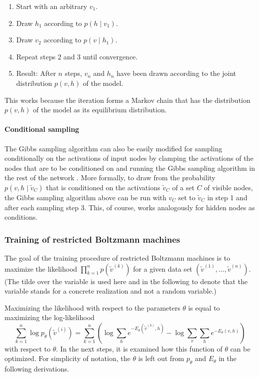 \documentclass[12pt]{article}
\begin{document}
\begin{enumerate}
\item Start with an arbitrary $v_1$.
\item Draw $h_1$ according to $p(h \mid v_1)$.
\item Draw $v_2$ according to $p(v \mid h_1)$.
\item Repeat steps 2 and 3 until convergence.
\item Result: After $n$ steps, $v_n$ and $h_n$ have been drawn according to the joint distribution $p(v,h)$ of the model.
\end{enumerate}

This works because the iteration forms a Markov chain that has the distribution $p(v,h)$ of the model as its equilibrium distribution.

\paragraph{Conditional sampling}\label{condsamplingrbm}
The Gibbs sampling algorithm can also be easily modified for sampling conditionally on the activations of input nodes by clamping the activations of the nodes that are to be conditioned on and running the Gibbs sampling algorithm in the rest of the network \citep{srivastava2012multimodal}.
More formally, to draw from the probability $p(v, h \mid \tilde{v}_C)$ that is conditioned on the activations $\tilde{v}_C$ of a set $C$ of visible nodes, the Gibbs sampling algorithm above can be run with $v_C$ set to $\tilde{v}_C$ in step 1 and after each sampling step 3.
This, of course, works analogously for hidden nodes as conditions.


\subsubsection{Training of restricted Boltzmann machines}\label{rbmtraining}
The goal of the training procedure of restricted Boltzmann machines is to maximize the likelihood $\prod_{k=1}^n p(\tilde{v}^{(k)})$ for a given data set $(\tilde{v}^{(1)}, \dots, \tilde{v}^{(n)})$.
(The tilde over the variable is used here and in the following to denote that the variable stands for a concrete realization and not a random variable.)

Maximizing the likelihood with respect to the parameters $\theta$ is equal to maximizing the log-likelihood
\[
\sum_{k=1}^{n}  \log p_\theta(\tilde{v}^{(i)}) = \sum_{k=1}^{n} \left( \log \sum_h e^{-E_\theta(\tilde{v}^{(k)}, h)} - \log \sum_v \sum_h e^{-E_\theta(v, h)} \right)
\]
with respect to $\theta$.
In the next steps, it is examined how this function of $\theta$ can be optimized.
For simplicity of notation, the $\theta$ is left out from $p_\theta$ and $E_\theta$ in the following derivations.
\end{document}
